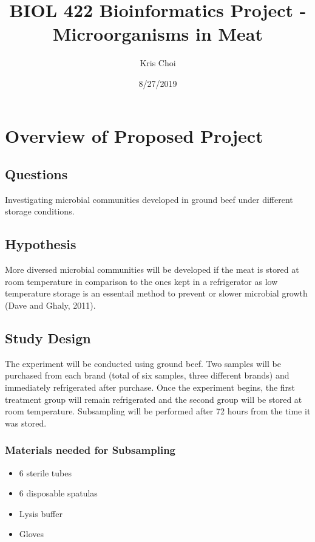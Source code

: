 \documentclass[]{article}
\title{BIOL 422 Bioinformatics Project - Microorganisms in Meat}
\author{Kris Choi}
\date{8/27/2019}
\providecommand{\tightlist}{%
  \setlength{\itemsep}{0pt}\setlength{\parskip}{0pt}}
\begin{document}
\maketitle

\hypertarget{overview-of-proposed-project}{%
\section{Overview of Proposed
Project}\label{overview-of-proposed-project}}

\hypertarget{questions}{%
\subsection{Questions}\label{questions}}

Investigating microbial communities developed in ground beef under
different storage conditions.

\hypertarget{hypothesis}{%
\subsection{Hypothesis}\label{hypothesis}}

More diversed microbial communities will be developed if the meat is
stored at room temperature in comparison to the ones kept in a
refrigerator as low temperature storage is an essentail method to
prevent or slower microbial growth (Dave and Ghaly, 2011).

\hypertarget{study-design}{%
\subsection{Study Design}\label{study-design}}

The experiment will be conducted using ground beef. Two samples will be
purchased from each brand (total of six samples, three different brands)
and immediately refrigerated after purchase. Once the experiment begins,
the first treatment group will remain refrigerated and the second group
will be stored at room temperature. Subsampling will be performed after
72 hours from the time it was stored.

\hypertarget{materials-needed-for-subsampling}{%
\subsubsection{Materials needed for
Subsampling}\label{materials-needed-for-subsampling}}

\begin{itemize}
\tightlist
\item
  6 sterile tubes
\item
  6 disposable spatulas
\item
  Lysis buffer
\item
  Gloves
\end{itemize}
\end{document}
